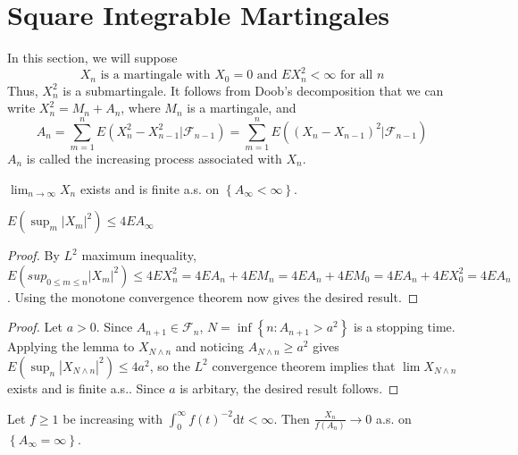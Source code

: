 \section{Square Integrable Martingales}
In this section, we will suppose \[X_n \text{ is a martingale with }X_0=0 \text{ and } EX_n^2<\infty \text{ for all } n\]
Thus, $X_n^2$ is a submartingale. It follows from Doob's decomposition that we can write $X_n^2=M_n+A_n$, where $M_n$ is a martingale, and \[A_n=\sum_{m=1}^nE(X_n^2-X_{n-1}^2|\mathcal{F}_{n-1})=\sum_{m=1}^nE((X_n-X_{n-1})^2|\mathcal{F}_{n-1})\]
$A_n$ is called the increasing process associated with $X_n$.
\begin{theorem}
$\lim_{n\to\infty}X_n$ exists and is finite a.s. on $\left\{A_\infty<\infty\right\}$.
\end{theorem}
\begin{lemma}
$E(\sup_m\left|X_m\right|^2)\le 4EA_\infty$
\end{lemma}
\begin{proof}
By $L^2$ maximum inequality, $E(sup_{0\le m\le n}\left|X_m\right|^2)\le 4EX_n^2=4EA_n+4EM_n=4EA_n+4EM_0=4EA_n+4EX_0^2=4EA_n$. Using the monotone convergence theorem now gives the desired result.
\end{proof}
\begin{proof}
Let $a>0$. Since $A_{n+1}\in \mathcal{F}_n$, $N=\inf\left\{n:A_{n+1}>a^2\right\}$ is a stopping time. Applying the lemma to $X_{N\wedge n}$ and noticing $A_{N\wedge n}\ge a^2$ gives $E(\sup_n\left|X_{N\wedge n}\right|^2)\le 4a^2$, so the $L^2$ convergence theorem implies that $\lim X_{N\wedge n}$ exists and is finite a.s.. Since $a$ is arbitary, the desired result follows.
\end{proof}
\begin{theorem}
Let $f\ge 1$ be increasing with $\int_0^\infty f(t)^{-2}\mathrm{d}t<\infty$. Then $\frac{X_n}{f(A_n)}\to 0$ a.s. on $\left\{A_\infty=\infty\right\}$.
\end{theorem}

